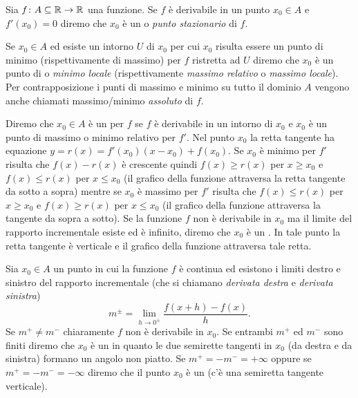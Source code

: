 \begin{definition}
Sia $f\colon A \subseteq \mathbb R \to \mathbb R$ una funzione. Se $f$ è derivabile in un
punto $x_0\in A$ e $f'(x_0) = 0$ diremo che $x_0$ è un 
o
\emph{punto stazionario}
di $f$.

Se $x_0\in A$ ed esiste un intorno $U$ di $x_0$ per cui $x_0$ risulta
essere un punto di minimo (rispettivamente di massimo) per $f$ ristretta ad $U$
diremo che $x_0$ è un punto di  o \emph{minimo locale}
(rispettivamente \emph{massimo relativo} o \emph{massimo locale}).
Per contrapposizione i punti di massimo e minimo su tutto il dominio $A$
vengono anche
chiamati massimo/minimo \emph{assoluto} di $f$.

Diremo che $x_0\in A$ è un  per $f$ se
$f$ è derivabile in un intorno di $x_0$ e $x_0$ è un punto di massimo
o minimo relativo per $f'$. Nel punto $x_0$ la retta tangente
ha equazione $y=r(x) = f'(x_0) (x-x_0) + f(x_0)$. Se $x_0$ è
minimo per $f'$ risulta che $f(x)-r(x)$ è crescente
quindi $f(x)\ge r(x)$ per $x\ge x_0$ e $f(x)\le r(x)$ per $x\le x_0$
(il grafico della funzione attraversa la retta tangente da sotto a sopra)
mentre se $x_0$ è massimo per $f'$ risulta che $f(x)\le r(x)$ per $x\ge x_0$
e $f(x) \ge r(x)$ per $x\le x_0$ (il grafico della funzione attraversa
la tangente da sopra a sotto).
Se la funzione $f$ non è derivabile in $x_0$ ma il limite del rapporto
incrementale esiste ed è infinito, diremo che $x_0$ è un
. In tale punto la retta tangente è verticale
e il grafico della funzione attraversa tale retta.

Sia $x_0\in A$ un punto in cui la funzione $f$ è continua ed esistono
i limiti destro e sinistro del rapporto incrementale
(che si chiamano \emph{derivata destra} e \emph{derivata sinistra})
\[
  m^{\pm} = \lim_{h\to 0^\pm}\frac{f(x+h) - f(x)}{h}.
\]
Se $m^+ \neq m^-$ chiaramente $f$ non è derivabile in $x_0$.
Se entrambi $m^+$ ed $m^-$ sono finiti diremo che $x_0$ è un
 in quanto le due semirette tangenti
in $x_0$ (da destra e da sinistra) formano un angolo non piatto.
Se $m^+=-m^-=+\infty$ oppure se $m^+=-m^-=-\infty$
diremo che il punto $x_0$ è un  (c'è una
semiretta tangente verticale).
\end{definition}

